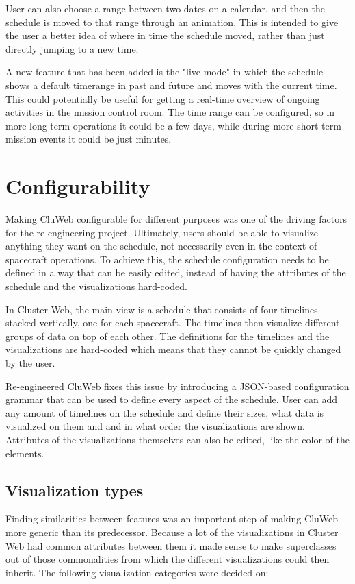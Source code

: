 User can also choose a range between two dates on a calendar, and then the schedule is moved to that range through an animation. This is intended to give the user a better idea of where in time the schedule moved, rather than just directly jumping to a new time.

 A new feature that has been added is the "live mode" in which the schedule shows a default timerange in past and future and moves with the current time. This could potentially be useful for getting a real-time overview of ongoing activities in the mission control room. The time range can be configured, so in more long-term operations it could be a few days, while during more short-term mission events it could be just minutes.

\section{Configurability}
Making CluWeb configurable for different purposes was one of the driving factors for the re-engineering project. Ultimately, users should be able to visualize anything they want on the schedule, not necessarily even in the context of spacecraft operations. To achieve this, the schedule configuration needs to be defined in a way that can be easily edited, instead of having the attributes of the schedule and the visualizations hard-coded.

In Cluster Web, the main view is a schedule that consists of four timelines stacked vertically, one for each spacecraft. The timelines then visualize different groups of data on top of each other. The definitions for the timelines and the visualizations are hard-coded which means that they cannot be quickly changed by the user.

Re-engineered CluWeb fixes this issue by introducing a JSON-based configuration grammar that can be used to define every aspect of the schedule. User can add any amount of timelines on the schedule and define their sizes, what data is visualized on them and and in what order the visualizations are shown. Attributes of the visualizations themselves can also be edited, like the color of the elements.

\subsection{Visualization types}  \label{vis_types}
Finding similarities between features was an important step of making CluWeb more generic than its predecessor. Because a lot of the visualizations in Cluster Web had common attributes between them it made sense to make superclasses out of those commonalities from which the different visualizations could then inherit. The following visualization categories were decided on:

